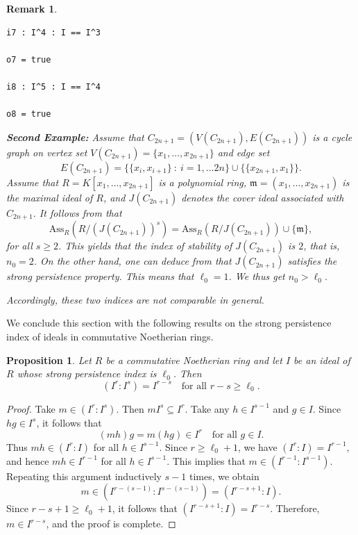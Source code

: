 \documentclass[11pt]{amsart}
\newtheorem{proposition}[theorem]{Proposition}
\newtheorem{remark}[theorem]{Remark}
\begin{document}
\begin{remark}
{\begin{verbatim}
i7 : I^4 : I == I^3

o7 = true

i8 : I^5 : I == I^4

o8 = true
\end{verbatim}

\medskip
\textbf{Second Example:}
 Assume that $C_{2n+1}=(V(C_{2n+1}), E(C_{2n+1}))$ is  a cycle graph on  vertex set $V(C_{2n+1})=\{x_1, \ldots, x_{2n+1}\}$ and edge set 
 $$E(C_{2n+1})=\{\{x_i, x_{i+1}\}~: ~ i=1, \ldots 2n\}\cup\{\{x_{2n+1}, x_1\}\}.$$
 Assume that \( R = K[x_1, \ldots, x_{2n+1}] \) is a polynomial ring, 
\( \mathfrak{m} = (x_1, \ldots, x_{2n+1}) \) is the maximal ideal of \(R\), 
and \( J(C_{2n+1}) \) denotes the cover ideal associated with \( C_{2n+1} \).
   It follows from \cite[Proposition 3.6]{NKA} that   $$\mathrm{Ass}_R(R/(J(C_{2n+1}))^s)= \mathrm{Ass}_R(R/J(C_{2n+1}))\cup \{\mathfrak{m}\},$$  for all $s\geq 2$. This yields that  the  index of stability of  $J(C_{2n+1})$ is $2$, that is, $n_0=2$. On the other hand, one can deduce from
    \cite[Theorem 3.3]{NKA} that $J(C_{2n+1})$ satisfies the strong persistence property. This means that $\ell_0=1$. We thus get $n_0>\ell_0$. 
    
   Accordingly,  these two indices  are not comparable in general.
}
\end{remark}






We conclude this section with the following results on the strong persistence index of ideals in commutative Noetherian rings.

\begin{proposition} \label{Pro.1}
Let $R$ be a commutative Noetherian ring and let $I$ be an ideal of $R$ whose strong persistence index is $\ell_0$. Then
\[
(I^r : I^s) = I^{r-s} \quad \text{for all } r - s \geq \ell_0.
\]
\end{proposition}

\begin{proof}
Take  $m \in (I^r : I^s)$. Then $m I^s \subseteq I^r$. Take any $h \in I^{s-1}$ and $g \in I$. Since $hg \in I^s$, it follows that
\[
(mh)g = m(hg) \in I^r \quad \text{for all } g \in I.
\]
Thus $mh \in (I^r : I)$ for all $h \in I^{s-1}$. Since $r \geq \ell_0 + 1$, we have
$(I^r : I) = I^{r-1},$
and hence $mh \in I^{r-1}$ for all $h \in I^{s-1}$. This implies that
  $m \in (I^{r-1} : I^{s-1}).$
Repeating this argument inductively $s-1$ times, we obtain
\[
m \in (I^{r-(s-1)} : I^{s-(s-1)}) = (I^{r-s+1} : I).
\]
Since $r - s + 1 \geq \ell_0 + 1$, it follows that $(I^{r-s+1} : I) = I^{r-s}.$ 
Therefore, $m \in I^{r-s}$, and the proof is complete.
\end{proof}
\end{document}
